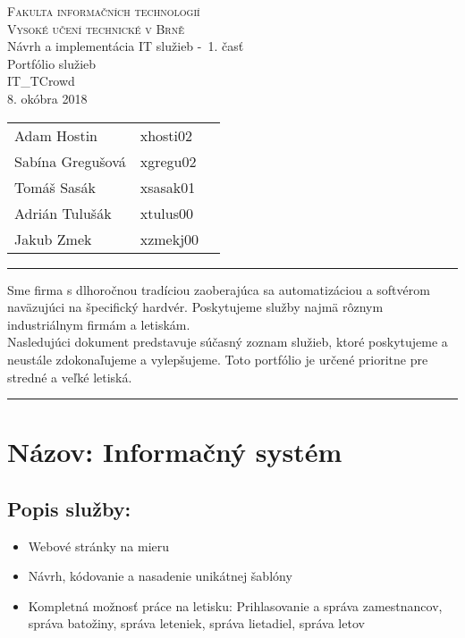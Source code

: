 \documentclass[a4paper, 11pt]{article}
\begin{document}
\begin{center}
\Huge
\textsc{Fakulta informačních technologií\\
Vysoké učení technické v Brně}
\\[84mm]
\LARGE Návrh a implementácia IT služieb \--\ 1. časť\\
\Huge Portfólio služieb\\
\vspace{3.5cm}
\LARGE IT\_TCrowd\\
\Large 8. okóbra 2018
\end{center}

\hfill

\begin{minipage}[l]{0.6 \textwidth}
\Large
\begin{tabular}{l l l}
Adam Hostin  & xhosti02\\
Sabína Gregušová & xgregu02\\
Tomáš Sasák & xsasak01 \\
Adrián Tulušák  & xtulus00 \\
Jakub Zmek & xzmekj00 \\
\end{tabular}
\end{minipage}
\thispagestyle{empty}
\clearpage

\setcounter{page}{1}
\noindent\rule{\textwidth}{1pt}
\begin{center}
Sme firma s dlhoročnou tradíciou zaoberajúca sa automatizáciou a softvérom naväzujúci na špecifický hardvér. Poskytujeme služby najmä rôznym industriálnym firmám a letiskám.  \\

Nasledujúci dokument predstavuje súčasný zoznam služieb, ktoré poskytujeme a neustále zdokonaľujeme a vylepšujeme. Toto portfólio je určené prioritne pre stredné a veľké letiská.\\
\end{center}
\noindent\rule{\textwidth}{1pt}

\section*{Názov: Informačný systém}
\subsection*{Popis služby:}
\begin{itemize}
\item Webové stránky na mieru
\item Návrh, kódovanie a nasadenie unikátnej šablóny
\item Kompletná možnosť práce na letisku: Prihlasovanie a správa zamestnancov, správa batožiny, správa leteniek, správa lietadiel, správa letov
\end{itemize}
\end{document}
